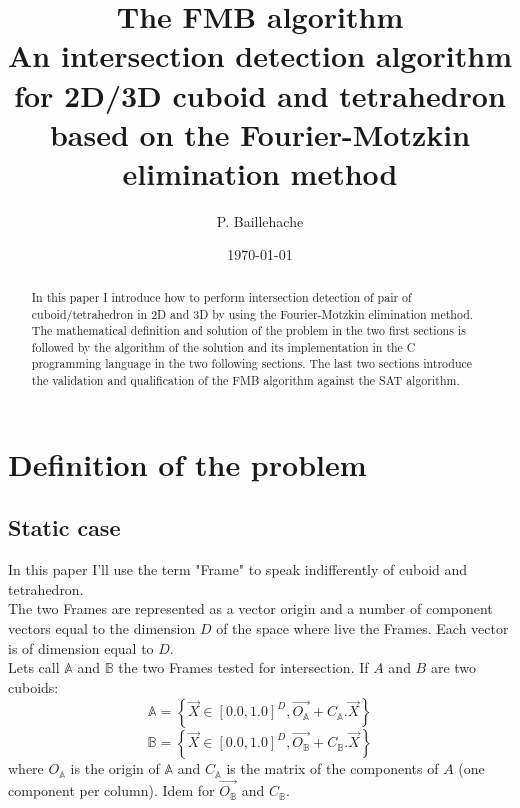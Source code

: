 \documentclass[12pt, a4paper]{article}
\begin{document}
\title{The FMB algorithm\\An intersection detection algorithm for 2D/3D cuboid and tetrahedron based on the Fourier-Motzkin elimination method}
\author{P. Baillehache}
\date{\today}
\maketitle

\begin{abstract}
In this paper I introduce how to perform intersection detection of pair of cuboid/tetrahedron in 2D and 3D by using the Fourier-Motzkin elimination method. The mathematical definition and solution of the problem in the two first sections is followed by the algorithm of the solution and its implementation in the C programming language in the two following sections. The last two sections introduce the validation and qualification of the FMB algorithm against the SAT algorithm.
\end{abstract}

\newpage
\tableofcontents

\section{Definition of the problem}

\subsection{Static case}

In this paper I'll use the term "Frame" to speak indifferently of cuboid and tetrahedron.\\

The two Frames are represented as a vector origin and a number of component vectors equal to the dimension $D$ of the space where live the Frames. Each vector is of dimension equal to $D$.\\

Lets call $\mathbb{A}$ and $\mathbb{B}$ the two Frames tested for intersection. If $A$ and $B$ are two cuboids:
\begin{equation}
\mathbb{A}=\left\lbrace\overrightarrow{X}\in[0.0,1.0]^D,\overrightarrow{O_\mathbb{A}}+C_\mathbb{A}.\overrightarrow{X}\right\rbrace
\end{equation}
\begin{equation}
\mathbb{B}=\left\lbrace\overrightarrow{X}\in[0.0,1.0]^D,\overrightarrow{O_\mathbb{B}}+C_\mathbb{B}.\overrightarrow{X}\right\rbrace
\end{equation}
where $O_\mathbb{A}$ is the origin of $\mathbb{A}$ and $C_\mathbb{A}$ is the matrix of the components of $A$ (one component per column). Idem for $\overrightarrow{O_\mathbb{B}}$ and $C_\mathbb{B}$.\\
\end{document}
